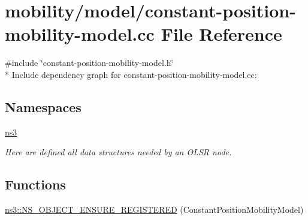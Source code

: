 \hypertarget{constant-position-mobility-model_8cc}{}\section{mobility/model/constant-\/position-\/mobility-\/model.cc File Reference}
\label{constant-position-mobility-model_8cc}
{\ttfamily \#include \char`\"{}constant-\/position-\/mobility-\/model.\+h\char`\"{}}\\*
Include dependency graph for constant-\/position-\/mobility-\/model.cc\+:
\subsection*{Namespaces}
\begin{DoxyCompactItemize}
\item 
 \hyperlink{namespacens3}{ns3}
\begin{DoxyCompactList}\small\item\em Here are defined all data structures needed by an O\+L\+SR node. \end{DoxyCompactList}\end{DoxyCompactItemize}
\subsection*{Functions}
\begin{DoxyCompactItemize}
\item 
\hyperlink{namespacens3_a7cf05dacfc1fc9431af8beb5f5a058ec}{ns3\+::\+N\+S\+\_\+\+O\+B\+J\+E\+C\+T\+\_\+\+E\+N\+S\+U\+R\+E\+\_\+\+R\+E\+G\+I\+S\+T\+E\+R\+ED} (Constant\+Position\+Mobility\+Model)
\end{DoxyCompactItemize}

